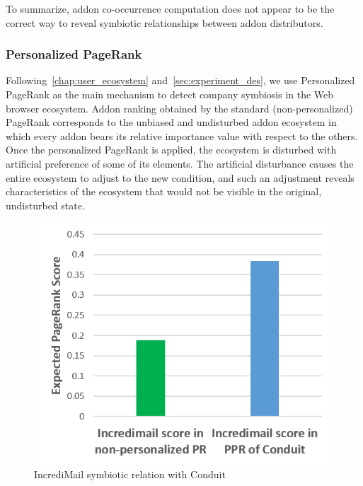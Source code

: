 \documentclass[11pt,oneside]{book}
\let\Oldsubsubsection\subsubsection
\renewcommand{\subsubsection}{\FloatBarrier\Oldsubsubsection}
\begin{document}
To summarize, addon co-occurrence computation does not appear to be the correct way to reveal symbiotic relationships between addon distributors.

\subsubsection{Personalized PageRank}

Following~\autoref{chap:user_ecosystem} and~\autoref{sec:experiment_des}, we use Personalized PageRank as the main mechanism to detect company symbiosis in the Web browser ecosystem. Addon ranking obtained by the standard (non-personalized) PageRank corresponds to the unbiased and undisturbed addon ecosystem in which every addon bears its relative importance value with respect to the others. Once the personalized PageRank is applied, the ecosystem is disturbed with artificial preference of some of its elements. The artificial disturbance causes the entire ecosystem to adjust to the new condition, and such an adjustment reveals characteristics of the ecosystem that would not be visible in the original, undisturbed state. 

\iffalse
\begin{figure}[!htbp]
\centering
\includegraphics[width=\linewidth]{figures/incredi_sym_conduit.png}
\caption{IncrediMail symbiotic relation with Conduit}
\label{fig:incredimail_sym_conduit}
\end{figure}
\end{document}
